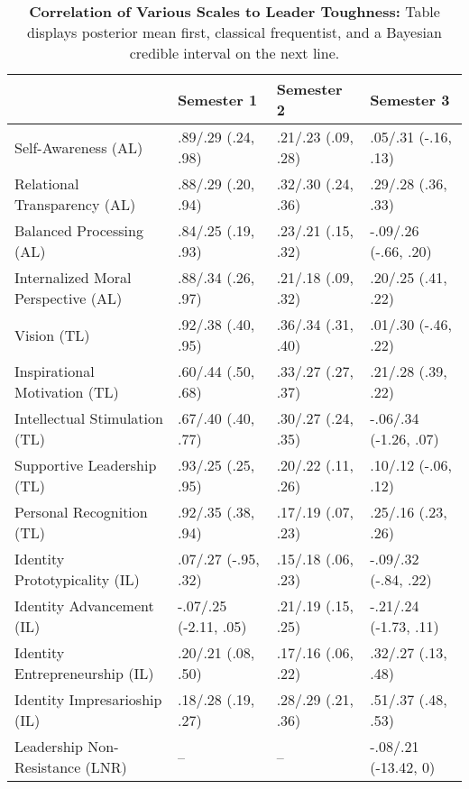 \begin{table}[ht]
\centering
\begin{tabular}{llll}
  \hline
 & Semester 1 & Semester 2 & Semester 3 \\ 
  \hline
Self-Awareness (AL) & .89/.29 (.24, .98) & .21/.23 (.09, .28) & .05/.31 (-.16, .13) \\ 
  Relational Transparency (AL) & .88/.29 (.20, .94) & .32/.30 (.24, .36) & .29/.28 (.36, .33) \\ 
  Balanced Processing (AL) & .84/.25 (.19, .93) & .23/.21 (.15, .32) & -.09/.26 (-.66, .20) \\ 
  Internalized Moral Perspective (AL) & .88/.34 (.26, .97) & .21/.18 (.09, .32) & .20/.25 (.41, .22) \\ 
  Vision (TL) & .92/.38 (.40, .95) & .36/.34 (.31, .40) & .01/.30 (-.46, .22) \\ 
  Inspirational Motivation (TL) & .60/.44 (.50, .68) & .33/.27 (.27, .37) & .21/.28 (.39, .22) \\ 
  Intellectual Stimulation (TL) & .67/.40 (.40, .77) & .30/.27 (.24, .35) & -.06/.34 (-1.26, .07) \\ 
  Supportive Leadership (TL) & .93/.25 (.25, .95) & .20/.22 (.11, .26) & .10/.12 (-.06, .12) \\ 
  Personal Recognition (TL) & .92/.35 (.38, .94) & .17/.19 (.07, .23) & .25/.16 (.23, .26) \\ 
  Identity Prototypicality (IL) & .07/.27 (-.95, .32) & .15/.18 (.06, .23) & -.09/.32 (-.84, .22) \\ 
  Identity Advancement (IL) & -.07/.25 (-2.11, .05) & .21/.19 (.15, .25) & -.21/.24 (-1.73, .11) \\ 
  Identity Entrepreneurship (IL) & .20/.21 (.08, .50) & .17/.16 (.06, .22) & .32/.27 (.13, .48) \\ 
  Identity Impresarioship (IL) & .18/.28 (.19, .27) & .28/.29 (.21, .36) & .51/.37 (.48, .53) \\ 
  Leadership Non-Resistance (LNR) & -- & -- & -.08/.21 (-13.42, 0) \\ 
   \hline
\end{tabular}
\caption{\textbf{Correlation of Various Scales to Leader Toughness:} Table displays posterior mean first, classical frequentist, and a Bayesian credible interval on the next line.} 
\label{tab:lead_corr}
\end{table}
